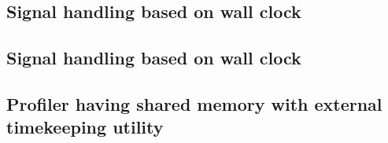 \documentclass[..thesis.tex]{subfiles}
\begin{document}
\subsection{Signal handling based on wall clock}

\subsection{Signal handling based on wall clock}

\subsection{Profiler having shared memory with external timekeeping utility}
\end{document}
